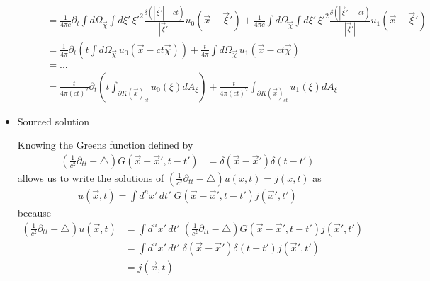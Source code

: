 \documentclass[../main.tex]{subfiles}
\begin{document}
\begin{itemize}
\begin{enumerate}
\begin{align}
&=\frac{1}{4\pi c}\partial_t\int d\Omega_{\vec{\chi}}\int d\xi'\,\xi'^2\frac{\delta(|\vec{\xi}'|-ct)}{|\vec{\xi}'|}u_0(\vec{x}-\vec{\xi}')+\frac{1}{4\pi c}\int d\Omega_{\vec{\chi}}\int d\xi'\,\xi'^2\frac{\delta(|\vec{\xi}'|-ct)}{|\vec{\xi}'|}u_1(\vec{x}-\vec{\xi}')\\
&=\frac{1}{4\pi}\partial_t\left(t\int d\Omega_{\vec{\chi}}\, u_0(\vec{x}-ct\vec{\chi})\right)+\frac{t}{4\pi}\int d\Omega_{\vec{\chi}}\, u_1(\vec{x}-ct\vec{\chi})\\
&=...\\
&=\frac{t}{4\pi(ct)^2}\partial_t\left(t\int_{\partial K(\vec{x})_{ct}}u_0(\xi)dA_\xi\right)+\frac{t}{4\pi(ct)^2}\int_{\partial K(\vec{x})_{ct}}u_1(\xi)dA_\xi
\end{align}
\end{enumerate}

\item Sourced solution

Knowing the Greens function defined by
\begin{align}
\left(\frac{1}{c^2}\partial_{tt}-\triangle\right) G(\vec{x}-\vec{x}',t-t')&=\delta(\vec{x}-\vec{x}')\delta(t-t')
\end{align}
allows us to write the solutions of $\left(\frac{1}{c^2}\partial_{tt}-\triangle\right) u(x,t)= j(x,t)$ as
\begin{align}
u(\vec{x},t)=\int d^nx'\,dt'\;G(\vec{x}-\vec{x}',t-t')j(\vec{x}',t')
\end{align}
because
\begin{align}
\left(\frac{1}{c^2}\partial_{tt}-\triangle\right)u(\vec{x},t)&=\int d^nx'\,dt'\;\left(\frac{1}{c^2}\partial_{tt}-\triangle\right)G(\vec{x}-\vec{x}',t-t')j(\vec{x}',t')\\
&=\int d^nx'\,dt'\;\delta(\vec{x}-\vec{x}')\delta(t-t')j(\vec{x}',t')\\
&=j(\vec{x},t)
\end{align}


\end{itemize}
\end{document}
